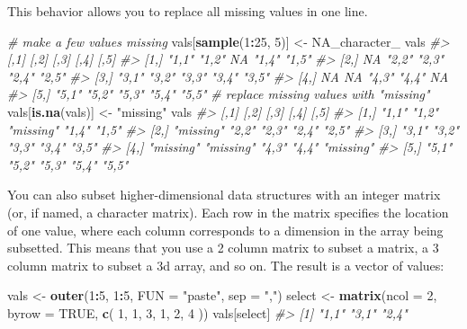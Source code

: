 \documentclass[]{book}
\newenvironment{Shaded}{\begin{snugshade}}{\end{snugshade}}
\newcommand{\CommentTok}[1]{\textcolor[rgb]{0.56,0.35,0.01}{\textit{#1}}}
\newcommand{\DataTypeTok}[1]{\textcolor[rgb]{0.13,0.29,0.53}{#1}}
\newcommand{\DecValTok}[1]{\textcolor[rgb]{0.00,0.00,0.81}{#1}}
\newcommand{\KeywordTok}[1]{\textcolor[rgb]{0.13,0.29,0.53}{\textbf{#1}}}
\newcommand{\NormalTok}[1]{#1}
\newcommand{\OperatorTok}[1]{\textcolor[rgb]{0.81,0.36,0.00}{\textbf{#1}}}
\newcommand{\OtherTok}[1]{\textcolor[rgb]{0.56,0.35,0.01}{#1}}
\newcommand{\StringTok}[1]{\textcolor[rgb]{0.31,0.60,0.02}{#1}}
\theoremstyle{definition}
\theoremstyle{definition}
\theoremstyle{definition}
\theoremstyle{remark}
\begin{document}
This behavior allows you to replace all missing values in one line.

\begin{Shaded}
\begin{Highlighting}[]
\CommentTok{# make a few values missing}
\NormalTok{vals[}\KeywordTok{sample}\NormalTok{(}\DecValTok{1}\OperatorTok{:}\DecValTok{25}\NormalTok{, }\DecValTok{5}\NormalTok{)] <-}\StringTok{ }\OtherTok{NA_character_}
\NormalTok{vals}
\CommentTok{#>      [,1]  [,2]  [,3]  [,4]  [,5] }
\CommentTok{#> [1,] "1,1" "1,2" NA    "1,4" "1,5"}
\CommentTok{#> [2,] NA    "2,2" "2,3" "2,4" "2,5"}
\CommentTok{#> [3,] "3,1" "3,2" "3,3" "3,4" "3,5"}
\CommentTok{#> [4,] NA    NA    "4,3" "4,4" NA   }
\CommentTok{#> [5,] "5,1" "5,2" "5,3" "5,4" "5,5"}
\CommentTok{# replace missing values with "missing"}
\NormalTok{vals[}\KeywordTok{is.na}\NormalTok{(vals)] <-}\StringTok{ "missing"}
\NormalTok{vals}
\CommentTok{#>      [,1]      [,2]      [,3]      [,4]  [,5]     }
\CommentTok{#> [1,] "1,1"     "1,2"     "missing" "1,4" "1,5"    }
\CommentTok{#> [2,] "missing" "2,2"     "2,3"     "2,4" "2,5"    }
\CommentTok{#> [3,] "3,1"     "3,2"     "3,3"     "3,4" "3,5"    }
\CommentTok{#> [4,] "missing" "missing" "4,3"     "4,4" "missing"}
\CommentTok{#> [5,] "5,1"     "5,2"     "5,3"     "5,4" "5,5"}
\end{Highlighting}
\end{Shaded}

You can also subset higher-dimensional data structures with an integer
matrix (or, if named, a character matrix). Each row in the matrix
specifies the location of one value, where each column corresponds to a
dimension in the array being subsetted. This means that you use a 2
column matrix to subset a matrix, a 3 column matrix to subset a 3d
array, and so on. The result is a vector of values:

\begin{Shaded}
\begin{Highlighting}[]
\NormalTok{vals <-}\StringTok{ }\KeywordTok{outer}\NormalTok{(}\DecValTok{1}\OperatorTok{:}\DecValTok{5}\NormalTok{, }\DecValTok{1}\OperatorTok{:}\DecValTok{5}\NormalTok{, }\DataTypeTok{FUN =} \StringTok{"paste"}\NormalTok{, }\DataTypeTok{sep =} \StringTok{","}\NormalTok{)}
\NormalTok{select <-}\StringTok{ }\KeywordTok{matrix}\NormalTok{(}\DataTypeTok{ncol =} \DecValTok{2}\NormalTok{, }\DataTypeTok{byrow =} \OtherTok{TRUE}\NormalTok{, }\KeywordTok{c}\NormalTok{(}
  \DecValTok{1}\NormalTok{, }\DecValTok{1}\NormalTok{,}
  \DecValTok{3}\NormalTok{, }\DecValTok{1}\NormalTok{,}
  \DecValTok{2}\NormalTok{, }\DecValTok{4}
\NormalTok{))}
\NormalTok{vals[select]}
\CommentTok{#> [1] "1,1" "3,1" "2,4"}
\end{Highlighting}
\end{Shaded}
\end{document}
